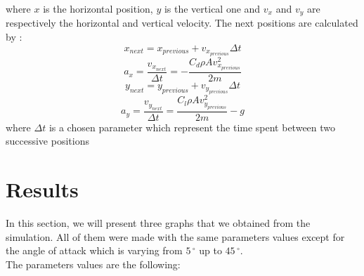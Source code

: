 \documentclass[10pt,a4paper]{report}
\begin{document}
where $x$ is the horizontal position, $y$ is the vertical one and $v_x$ and $v_y$ are respectively the horizontal and vertical velocity.
The next positions are calculated by :
\[x_{next} = x_{previous} + v_{x_{previous}} \Delta t \]
\[a_x=\frac{v_{x_{next}}}{\Delta t} = -\frac{C_d \rho A  v_{x_{previous}}^2}{2m}\]
\[y_{next} = y_{previous} + v_{y_{previous}} \Delta t \]
\[a_y = \frac{v_{y_{next}}}{\Delta t} = \frac{C_l \rho A  v_{y_{previous}}^2}{2m} - g\]
where $\Delta t$ is a chosen parameter which represent the time spent between two successive positions
\section{Results}
In this section, we will present three graphs that we obtained from the simulation. All of them were made with the same parameters values except for the angle of attack which is varying from $5\,^{\circ}$ up to $45\,^{\circ} $. 
\\The parameters values are the following:
\end{document}
